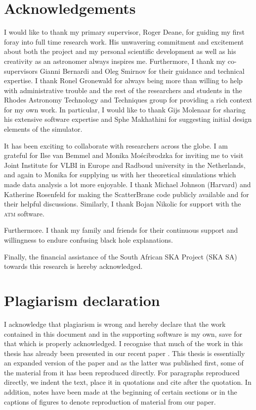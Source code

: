 
 
\chapter*{Acknowledgements}
I would like to thank my primary supervisor, Roger Deane, for guiding my first foray into full time research work. His unwavering commitment and excitement about both the project and my personal scientific development as well as his creativity as an astronomer always inspires me. Furthermore, I thank my co-supervisors Gianni Bernardi and Oleg Smirnov for their guidance and technical expertise. I thank Ronel Gronewald for always being more than willing to help with administrative trouble and the rest of the researchers and students in the Rhodes Astronomy Technology and Techniques group for providing a rich context for my own work. In particular, I would like to thank Gijs Molenaar for sharing his extensive software expertise and Sphe Makhathini for suggesting initial design elements of the simulator. 


It has been exciting to collaborate with researchers across the globe. I am grateful for Ilse van Bemmel and Monika Mo\'{s}cibrodzka for inviting me to visit Joint Institute for VLBI in Europe and Radboud university in the Netherlands, and again to Monika for supplying us with her theoretical simulations which made data analysis a lot more enjoyable. I thank Michael Johnson (Harvard) and Katherine Rosenfeld for making the {\sc ScatterBrane} code publicly available and for their helpful discussions. Similarly, I thank Bojan Nikolic for support with the \textsc{atm} software.  

Furthermore. I thank my family and friends for their continuous support and willingness to endure confusing black hole explanations.

Finally, the financial assistance of the South African SKA Project (SKA SA) towards this research is hereby acknowledged. 

\chapter*{Plagiarism declaration}
 I acknowledge that plagiarism is wrong and hereby declare that the work contained in this document and in the supporting software is my own, save for that which is properly acknowledged. I recognise that much of the work in this thesis has already been presented in our recent paper \citep{Blecher_2016}. This thesis is essentially an expanded version of the paper and as the latter was published first, some of the material from it has been reproduced directly. For paragraphs reproduced directly, we indent the text, place it in quotations and cite \citep{Blecher_2016} after the quotation. In addition, notes have been made at the beginning of certain sections or in the captions of figures to denote reproduction of material from our paper.
 \vspace{55pt}
 

